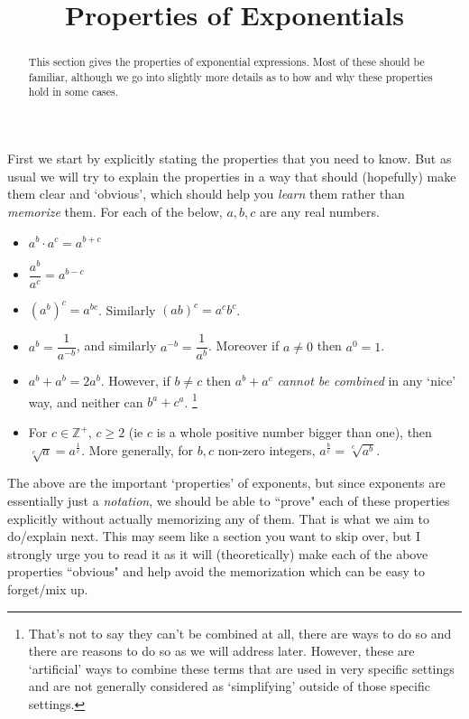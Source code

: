 \documentclass{ximeraXloud}
\title{Properties of Exponentials}
\begin{document}
\begin{abstract}
    This section gives the properties of exponential expressions. Most of these should be familiar, although we go into slightly more details as to how and why these properties hold in some cases.
\end{abstract}
\maketitle


First we start by explicitly stating the properties that you need to know. But as usual we will try to explain the properties in a way that should (hopefully) make them clear and `obvious', which should help you \textit{learn} them rather than \textit{memorize} them. For each of the below, $a,b,c$ are any real numbers.
\begin{itemize}
    \item $a^b \cdot a^c = a^{b+c}$
    \item $\dfrac{a^b}{a^c} = a^{b-c}$
    \item $\left(a^b\right)^c = a^{bc}$. Similarly $(ab)^c = a^cb^c$.
    \item $a^b = \dfrac{1}{a^{-b}}$, and similarly $a^{-b} = \dfrac{1}{a^b}$. Moreover if $a \neq 0$ then $a^0 = 1$.
    \item $a^b + a^b = 2a^b$. However, if $b \neq c$ then $a^b + a^c$ \textit{cannot be combined} in any `nice' way, and neither can $b^a + c^a$.%
    \footnote{%
        That's not to say they can't be combined at all, there are ways to do so and there are reasons to do so as we will address later. However, these are `artificial' ways to combine these terms that are used in very specific settings and are not generally considered as `simplifying' outside of those specific settings.
        }
    \item For $c \in \mathbb{Z}^+$, $c \geq 2$ (ie $c$ is a whole positive number bigger than one), then $\sqrt[c]{a} = a^{\frac{1}{c}}$. More generally, for $b,c$ non-zero integers, $a^{\frac{b}{c}} = \sqrt[c]{a^b}$.
\end{itemize}

The above are the important `properties' of exponents, but since exponents are essentially just a \textit{notation}, we should be able to ``prove" each of these properties explicitly without actually memorizing any of them. That is what we aim to do/explain next. This may seem like a section you want to skip over, but I strongly urge you to read it as it will (theoretically) make each of the above properties ``obvious" and help avoid the memorization which can be easy to forget/mix up.
\end{document}
